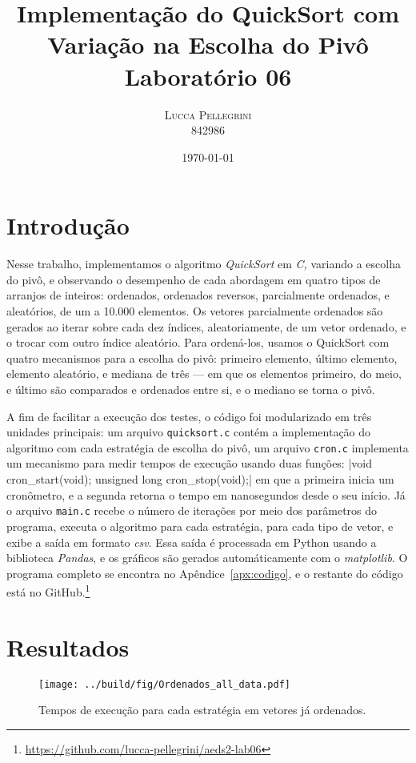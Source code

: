 \documentclass[10pt,oneside,onecolumn]{article}
\title{{\huge\bfseries Implementação do QuickSort com Variação na Escolha do
	Pivô}\\
Laboratório 06}
\author{ %
	\textsc{Lucca Pellegrini} \\
	\normalsize{842986}
}
\date{\today}
\begin{document}

\maketitle
\section{Introdução}

Nesse trabalho, implementamos o algoritmo \textit{QuickSort} em \textit{C,}
variando a escolha do pivô, e observando o desempenho de cada abordagem em
quatro tipos de arranjos de inteiros: ordenados, ordenados reversos,
parcialmente ordenados, e aleatórios, de um a 10.000 elementos. Os vetores
parcialmente ordenados são gerados ao iterar sobre cada dez índices,
aleatoriamente, de um vetor ordenado, e o trocar com outro índice aleatório.
Para ordená-los, usamos o QuickSort com quatro mecanismos para a escolha do
pivô: primeiro elemento, último elemento, elemento aleatório, e mediana de três
--- em que os elementos primeiro, do meio, e último são comparados e ordenados
entre si, e o mediano se torna o pivô.

A fim de facilitar a execução dos testes, o código foi modularizado em três
unidades principais: um arquivo \texttt{quicksort.c} contém a implementação do
algoritmo com cada estratégia de escolha do pivô, um arquivo \texttt{cron.c}
implementa um mecanismo para medir tempos de execução usando duas funções:
|void cron_start(void); unsigned long cron_stop(void);| em que a
primeira inicia um cronômetro, e a segunda retorna o tempo em nanosegundos
desde o seu início. Já o arquivo \texttt{main.c} recebe o número de iterações
por meio dos parâmetros do programa, executa o algoritmo para cada estratégia,
para cada tipo de vetor, e exibe a saída em formato \textit{csv}. Essa saída é
processada em Python usando a biblioteca \textit{Pandas}, e os gráficos são
gerados automáticamente com o \textit{matplotlib}. O programa completo se
encontra no Apêndice~\ref{apx:codigo}, e o restante do código está no
GitHub.\footnote{\url{https://github.com/lucca-pellegrini/aeds2-lab06}}

\newpage
\section{Resultados}



\begin{figure}[H]
	\centering
	\texttt{[image: ../build/fig/Ordenados\_all\_data.pdf]}
	\captionsetup{skip=0pt} %
	\caption{Tempos de execução para cada estratégia em vetores já ordenados.}
	\label{fig:ord}
\end{figure}
\end{document}
